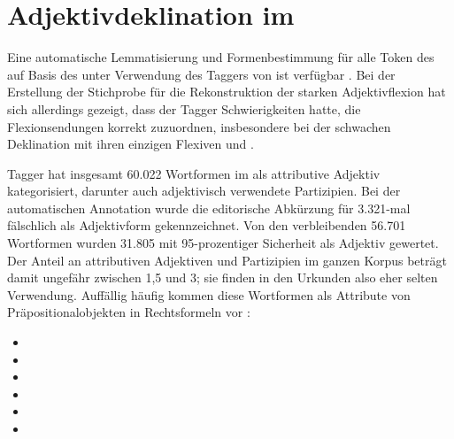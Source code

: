 \section[Adjektivdeklination im \tit{Corpus der altdeutschen Originalurkunden}]{Adjektivdeklination im \CAO{}}
\label{sec:adjdeclcao}

\label{phsec:formelhaftigkeit}
Eine automatische Lemmatisierung und Formenbestimmung für alle Token des
\CAO{} auf Basis des  unter Verwendung des Taggers von
\citet{schmid2019} ist verfügbar
\autocites[vgl.][207]{beckerschallert2021}[155--158]{beckerschallert2022b}. Bei
der Erstellung der Stichprobe für die Rekonstruktion der starken
Adjektivflexion hat sich allerdings gezeigt, dass der Tagger Schwierigkeiten
hatte, die Flexionsendungen korrekt zuzuordnen, insbesondere bei der schwachen
Deklination mit ihren einzigen Flexiven  und .

 Tagger hat insgesamt 60.022 Wortformen im \CAO{}
als attributive Adjektiv kategorisiert, darunter auch adjektivisch verwendete
Partizipien. Bei der automatischen Annotation wurde die editorische Abkürzung
 für  3.321-mal fälschlich als Adjektivform gekennzeichnet.
Von den verbleibenden 56.701 Wortformen wurden 31.805 mit 95-prozentiger
Sicherheit als Adjektiv gewertet. Der Anteil an attributiven Adjektiven und
Partizipien im ganzen Korpus beträgt damit ungefähr zwischen 1,5 und 3\pct{};
sie finden in den Urkunden also eher selten Verwendung. Auffällig häufig kommen
diese Wortformen als Attribute von Präpositionalobjekten in Rechtsformeln vor
\autocites[vgl.][30]{becker2016}:%

\begin{itemize}
	\item %
	\item {}
	\item %
	\item %
	\item %
	\item %
\end{itemize}


